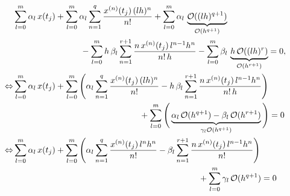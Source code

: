 \documentclass[12pt]{article}
\begin{document}
\begin{align}
	 & \sum_{l=0}^{{m}}\alpha_l\,x(t_j)
	+ 
	\sum_{l=0}^{{m}}\alpha_l\sum_{n=1}^{q} \frac{x^{(n)}(t_j)\,(lh)^{n}}{n!}
	+ 
	\sum_{l=0}^{{m}}\alpha_l\,\underbrace{\mathcal{O}((lh)^{q+1})}_{\mathcal{O}(h^{q+1})}
	\notag                                                                 \\ 
	 & \qquad\qquad\qquad\qquad 
	- \sum_{l=0}^{{m}} h\,\beta_l \sum_{n=1}^{r+1} \frac{n\,x^{(n)}(t_j)\,l^{n-1}h^{n}}{n!\,h} 
	- \sum_{l=0}^{{m}} \beta_l\,\underbrace{h\,\mathcal{O}((lh)^{r})}_{\mathcal{O}(h^{r+1})}
	= 0,
	\notag                                                                 \\
	\Leftrightarrow
	 & \sum_{l=0}^{{m}}\alpha_l\,x(t_j) 
	+ \sum_{l=0}^{{m}}
	\Bigg(
	\alpha_l\sum_{n=1}^{q} \frac{x^{(n)}(t_j)\,(lh)^{n}}{n!}
	- h\,\beta_l \sum_{n=1}^{r+1} \frac{n\,x^{(n)}(t_j)\,l^{n-1}h^{n}}{n!\,h} 
	\Bigg) \notag                                                          \\
	 & \qquad\qquad\qquad\qquad\qquad\qquad\qquad\quad 
	+ \sum_{l=0}^{{m}}
	\Bigg(
	\underbrace{\alpha_l\,\mathcal{O}(h^{q+1}) - \beta_l\,\mathcal{O}(h^{r+1})}_{\gamma_l\mathcal{O}(h^{q+1})}
	\Bigg) = 0
	\notag                                                                 \\
	\Leftrightarrow
	 & \sum_{l=0}^{{m}}\alpha_l\,x(t_j) 
	+ \sum_{l=0}^{{m}}
	\Bigg(
	\alpha_l\sum_{n=1}^{q} \frac{x^{(n)}(t_j)\,l^{n}h^{n}}{n!}
	- \beta_l \sum_{n=1}^{r+1} \frac{n\,x^{(n)}(t_j)\,l^{n-1}h^{n}}{n!} 
	\Bigg) \notag                                                          \\
	 & \qquad\qquad\qquad\qquad\qquad\qquad\qquad\qquad\qquad\qquad\qquad 
	+ \sum_{l=0}^{{m}}
	\gamma_l\,\mathcal{O}(h^{q+1}) = 0
	\notag                                                                 \\
\end{align}
\newpage
\end{document}
